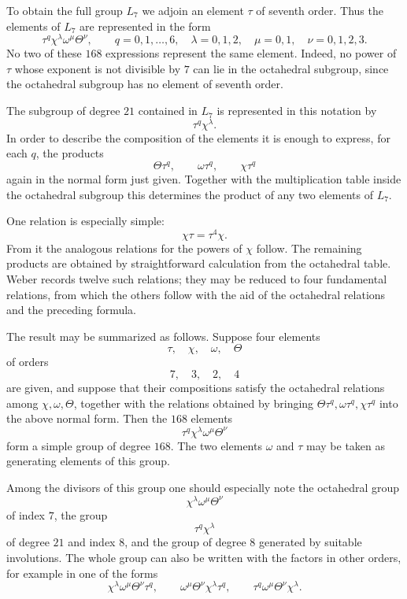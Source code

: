 \documentclass[11pt,a4paper]{book}
\begin{document}
To obtain the full group \(L_7\) we adjoin an element \(\tau\) of seventh order.  Thus the elements of \(L_7\) are represented in the form
\[
 \tau^q\chi^\lambda\omega^\mu\Theta^\nu,
 \qquad
 q=0,1,\ldots,6,\quad
 \lambda=0,1,2,\quad
 \mu=0,1,\quad
 \nu=0,1,2,3.
\]
No two of these \(168\) expressions represent the same element.  Indeed, no power of \(\tau\) whose exponent is not divisible by \(7\) can lie in the octahedral subgroup, since the octahedral subgroup has no element of seventh order.

The subgroup of degree \(21\) contained in \(L_7\) is represented in this notation by
\[
 \tau^q\chi^\lambda .
\]
In order to describe the composition of the elements it is enough to express, for each \(q\), the products
\[
 \Theta\tau^q,\qquad \omega\tau^q,\qquad \chi\tau^q
\]
again in the normal form just given.  Together with the multiplication table inside the octahedral subgroup this determines the product of any two elements of \(L_7\).

One relation is especially simple:
\[
 \chi\tau=\tau^4\chi.
\]
From it the analogous relations for the powers of \(\chi\) follow.  The remaining products are obtained by straightforward calculation from the octahedral table.  Weber records twelve such relations; they may be reduced to four fundamental relations, from which the others follow with the aid of the octahedral relations and the preceding formula.

The result may be summarized as follows.  Suppose four elements
\[
 \tau,\quad \chi,\quad \omega,\quad \Theta
\]
of orders
\[
 7,\quad 3,\quad 2,\quad 4
\]
are given, and suppose that their compositions satisfy the octahedral relations among \(\chi,\omega,\Theta\), together with the relations obtained by bringing
\(\Theta\tau^q,\omega\tau^q,\chi\tau^q\) into the above normal form.  Then the \(168\) elements
\[
 \tau^q\chi^\lambda\omega^\mu\Theta^\nu
\]
form a simple group of degree \(168\).  The two elements \(\omega\) and \(\tau\) may be taken as generating elements of this group.

Among the divisors of this group one should especially note the octahedral group
\[
 \chi^\lambda\omega^\mu\Theta^\nu
\]
of index \(7\), the group
\[
 \tau^q\chi^\lambda
\]
of degree \(21\) and index \(8\), and the group of degree \(8\) generated by suitable involutions.  The whole group can also be written with the factors in other orders, for example in one of the forms
\[
 \chi^\lambda\omega^\mu\Theta^\nu\tau^q,\qquad
 \omega^\mu\Theta^\nu\chi^\lambda\tau^q,\qquad
 \tau^q\omega^\mu\Theta^\nu\chi^\lambda .
\]
\end{document}
